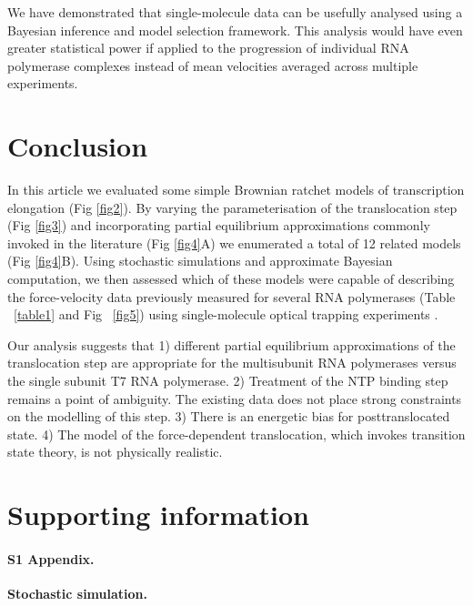 \documentclass[10pt,letterpaper]{article}
\begin{document}
We have demonstrated that single-molecule data can be usefully analysed using a Bayesian inference and model selection framework. This analysis would have even greater statistical power if applied to the progression of individual RNA polymerase complexes instead of mean velocities averaged across multiple experiments.  \\



\section*{Conclusion}


In this article we evaluated some simple Brownian ratchet models of transcription elongation (Fig \ref{fig2}). By varying the parameterisation of the translocation step  (Fig \ref{fig3}) and incorporating partial equilibrium approximations commonly invoked in the literature   (Fig \ref{fig4}A) we enumerated a total of 12 related models (Fig \ref{fig4}B). Using stochastic simulations and approximate Bayesian computation, we then assessed which of these models were capable of describing the force-velocity data previously measured for several RNA polymerases (Table ~\ref{table1} and Fig ~\ref{fig5}) using single-molecule optical trapping experiments \cite{abbondanzieri2005direct, schweikhard2014transcription, thomen2008t7}.

Our analysis suggests that 1) different partial equilibrium approximations of the translocation step are appropriate for the multisubunit RNA polymerases versus the single subunit  T7 RNA polymerase. 2) Treatment of the NTP binding step remains a point of ambiguity. The existing data does not place strong constraints on the modelling of this step. 3) There is an energetic bias for posttranslocated state. 4) The model of the force-dependent translocation, which invokes transition state theory, is not physically realistic.







\section*{Supporting information}



\paragraph*{S1 Appendix.}
\label{S1_Appendix}
\textbf{ Stochastic simulation.}
\end{document}
